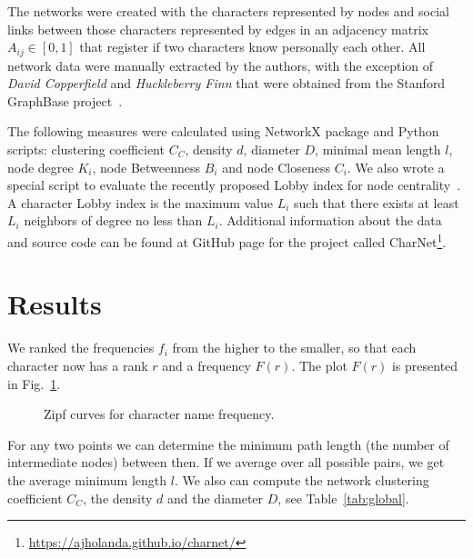 \documentclass[review]{elsarticle}
\begin{document}
The networks were created with the characters represented by nodes and 
social links between those characters represented by edges in an
adjacency matrix $A_{ij} \in [0,1]$ that register if two
characters know personally each other. All network
data were manually extracted by the authors, with the exception of 
 \emph{David Copperfield} and \emph{Huckleberry Finn} 
  that were obtained from the Stanford GraphBase project~\citep{sgb}.

The following measures were calculated using NetworkX 
package and Python scripts: clustering coefficient $C_C$, 
density $d$, diameter $D$,
minimal mean length $l$, node degree $K_i$, node
Betweenness $B_i$ and node Closeness $C_i$.
We also wrote a special script to 
evaluate the recently proposed Lobby
index for node centrality~\cite{korn2009lobby,
campiteli2013lobby,lu2016h}.
A character Lobby index is the maximum value $L_i$ such that there 
exists at least $L_i$ neighbors of degree no less than  $L_i$. 
Additional information about the data and source code can be found 
at GitHub page for the 
project called CharNet\footnote{\url{https://ajholanda.github.io/charnet/}}.

\section{Results}
\label{Results}


We ranked the frequencies $f_i$ from the higher to the smaller,
so that each character now has a rank $r$ and a frequency $F(r)$.
The plot $F(r)$ is presented in Fig.~\ref{fig:zipf}.

\begin{figure}[ht]
	\centering
		\qquad
		\caption{Zipf curves for character name frequency.}
        \label{fig:zipf}
\end{figure}

For any two points we can determine the minimum path length
(the number of intermediate nodes) between then. If we average over
all possible pairs, we get the average minimum length $l$.
We also can compute the network clustering coefficient $C_C$, 
the density $d$ and the diameter $D$, see Table~\ref{tab:global}.
\end{document}
